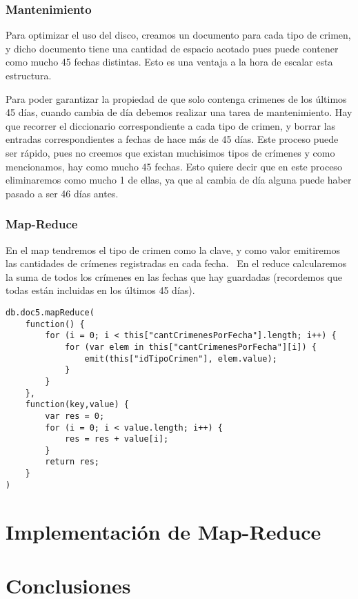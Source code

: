 \documentclass[11pt, a4paper]{article}
\begin{document}
\subsubsection{Mantenimiento}

Para optimizar el uso del disco, creamos un documento para cada tipo de crimen, y dicho documento tiene una cantidad de espacio acotado pues puede contener como mucho 45 fechas distintas. Esto es una ventaja a la hora de escalar esta estructura.\

Para poder garantizar la propiedad de que solo contenga crimenes de los \'ultimos 45 d\'ias, cuando cambia de d\'ia debemos realizar una tarea de mantenimiento. Hay que recorrer el diccionario correspondiente a cada tipo de crimen, y borrar las entradas correspondientes a fechas de hace más de 45 días. Este proceso puede ser r\'apido, pues no creemos que existan muchisimos tipos de cr\'imenes y como mencionamos, hay como mucho 45 fechas. Esto quiere decir que en este proceso eliminaremos como mucho 1 de ellas, ya que al cambia de d\'ia alguna puede haber pasado a ser 46 d\'ias antes.

\subsubsection{Map-Reduce}

En el map tendremos el tipo de crimen como la clave, y como valor emitiremos las cantidades de crímenes registradas en cada fecha. \
En el reduce calcularemos la suma de todos los crímenes en las fechas que hay guardadas (recordemos que todas están incluidas en los últimos 45 días). \
\begin{lstlisting}
db.doc5.mapReduce(
    function() {
    	for (i = 0; i < this["cantCrimenesPorFecha"].length; i++) {
    		for (var elem in this["cantCrimenesPorFecha"][i]) {
				emit(this["idTipoCrimen"], elem.value);
			}
    	}
    },
    function(key,value) {
    	var res = 0;
    	for (i = 0; i < value.length; i++) {
    		res = res + value[i];
    	}
    	return res;
    }
)
\end{lstlisting}

\section{Implementaci\'on de Map-Reduce}

\section{Conclusiones}
\end{document}
